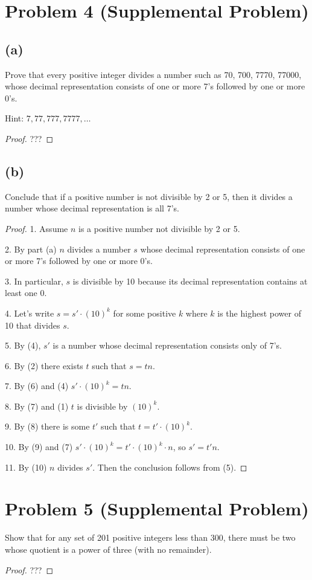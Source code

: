 \documentclass[14pt]{extarticle}
\begin{document}
\section{Problem 4 (Supplemental Problem)}
\subsection{(a)}
Prove that every positive integer divides a number such as 70, 700, 7770, 77000, whose decimal representation consists of one or more 7’s followed by one or more 0’s.

Hint: $7, 77, 777, 7777, \ldots$
\begin{proof}
???
\end{proof}

\subsection{(b)}
Conclude that if a positive number is not divisible by 2 or 5, then it divides a number whose decimal representation is all 7’s.
\begin{proof}
1. Assume $n$ is a positive number not divisible by 2 or 5.

2. By part (a) $n$ divides a number $s$ whose decimal representation consists of one or more 7's followed by one or more 0's.

3. In particular, $s$ is divisible by 10 because its decimal representation contains at least one 0. 

4. Let's write $s = s' \cdot (10)^k$ for some positive $k$ where $k$ is the highest power of 10 that divides $s$.

5. By (4), $s'$ is a number whose decimal representation consists only of 7's.

6. By (2) there exists $t$ such that $s = tn$.

7. By (6) and (4) $s' \cdot (10)^k = tn$.

8. By (7) and (1) $t$ is divisible by $(10)^k$. 

9. By (8) there is some $t'$ such that $t = t' \cdot (10)^k$.

10. By (9) and (7) $s' \cdot (10)^k = t'\cdot (10)^k \cdot n$, so $s' = t' n$.

11. By (10) $n$ divides $s'$. Then the conclusion follows from (5).
\end{proof}

\section{Problem 5 (Supplemental Problem)}
Show that for any set of 201 positive integers less than 300, there must be two whose quotient is a power of three (with no remainder).
\begin{proof}
???
\end{proof}
\end{document}
